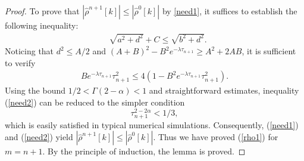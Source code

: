 \documentclass[10pt,a4paper]{amsart}
\begin{document}
\begin{proof}
To prove that $|\hat{\rho}^{n+1}[k]|\leq |\hat{\rho}^{0}[k]|$ by \eqref{need1}, it suffices to establish the following inequality:
\begin{align*}
& \sqrt{a^2 + d^2} + C \le \sqrt{b^2 + d^2}.
\end{align*}
Noticing that $d^2 \leq {A}/{2}$ and $(A+B)^2-B^2e^{-\lambda\tau_{n+1}}\geq A^2+2AB$, it is sufficient to verify
\begin{align}
    {Be^{-\lambda\tau_{n+1}}\tau_{n+1}^2}\leq 4({1-B^2e^{-\lambda\tau_{n+1}}\tau_{n+1}^2}).\label{need2}
\end{align}
Using the bound \(1/2<\Gamma(2-\alpha)<1\) and straightforward estimates, inequality (\ref{need2}) can be reduced to the simpler condition
\[
\tau_{n+1}^{2-2\alpha}<1/3,
\]
which is easily satisfied in typical numerical simulations. Consequently, (\ref{need1}) and (\ref{need2}) yield \(|\hat{\rho}^{n+1}[k]|\leq |\hat{\rho}^{0}[k]|\). Thus we
have proved (\ref{rho1}) for $m = n+1$. By the principle of induction, the lemma is proved.
\end{proof}
\end{document}
